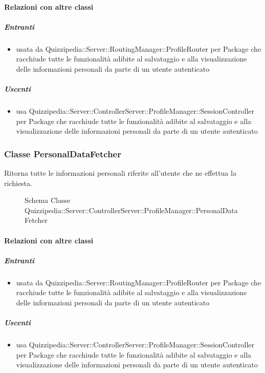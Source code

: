 \paragraph{Relazioni con altre classi}
\subparagraph{Entranti}
\begin{itemize}
\item usata da Quizzipedia::Server::RoutingManager::ProfileRouter per Package che racchiude tutte le funzionalità adibite al salvataggio e alla visualizzazione delle informazioni personali da parte di un utente autenticato
\end{itemize}
\subparagraph{Uscenti}
\begin{itemize}
\item usa Quizzipedia::Server::ControllerServer::ProfileManager::SessionController per Package che racchiude tutte le funzionalità adibite al salvataggio e alla visualizzazione delle informazioni personali da parte di un utente autenticato
\end{itemize}
\subsubsection{Classe PersonalDataFetcher}
Ritorna tutte le informazioni personali riferite all'utente che ne effettua la richiesta.
\begin{figure}[H]
\centering
\noindent{}
\caption[Schema Classe PersonalDataFetcher]{Schema Classe Quizzipedia::Server::ControllerServer::ProfileManager::PersonalDataFetcher}
\end{figure}
\paragraph{Relazioni con altre classi}
\subparagraph{Entranti}
\begin{itemize}
\item usata da Quizzipedia::Server::RoutingManager::ProfileRouter per Package che racchiude tutte le funzionalità adibite al salvataggio e alla visualizzazione delle informazioni personali da parte di un utente autenticato
\end{itemize}
\subparagraph{Uscenti}
\begin{itemize}
\item usa Quizzipedia::Server::ControllerServer::ProfileManager::SessionController per Package che racchiude tutte le funzionalità adibite al salvataggio e alla visualizzazione delle informazioni personali da parte di un utente autenticato
\end{itemize}
